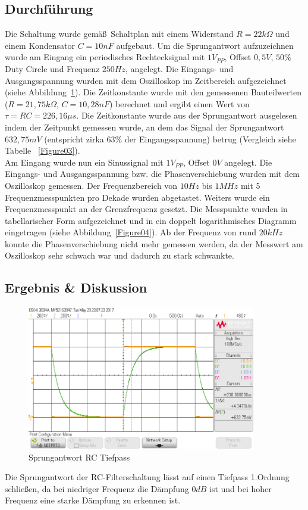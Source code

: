 \documentclass[12pt,a4paper,titlepage]{article}
\begin{document}
\subsection{Durchf\"uhrung}
Die Schaltung wurde gem\"a\ss\, Schaltplan mit einem Widerstand $R=22k\Omega$ und einem Kondensator $C=10nF$ aufgebaut. Um die Sprungantwort aufzuzeichnen wurde am Eingang ein periodisches Rechtecksignal mit $1 V_{PP}$, Offset $0,5 V$, $50 \%$ Duty Circle und Frequenz $250 Hz$, angelegt. Die Eingangs- und Ausgangsspannung wurden mit dem Oszilloskop im Zeitbereich aufgezeichnet (siehe Abbildung~\ref{Figure02}). Die Zeitkonstante wurde mit den gemessenen Bauteilwerten ($R=21,75 k\Omega$, $C=10,28nF$) berechnet und ergibt einen Wert von $\tau = RC = 226,16 \mu s$. Die Zeitkonstante wurde aus der Sprungantwort ausgelesen indem der Zeitpunkt gemessen wurde, an dem das Signal der Sprungantwort $632,75 mV$ (entspricht zirka $63 \%$ der Eingangsspannung) betrug (Vergleich siehe Tabelle ~\ref{Figure03}). \\
Am Eingang wurde nun ein Sinussignal mit $1 V_{PP}$, Offset $0 V$ angelegt. Die Eingangs- und Ausgangsspannung bzw. die Phasenverschiebung wurden mit dem Oszilloskop gemessen. Der Frequenzbereich von $10Hz$ bis $1MHz$ mit 5 Frequenzmesspunkten pro Dekade wurden abgetastet. Weiters wurde ein Frequenzmesspunkt an der Grenzfrequenz gesetzt. Die Messpunkte wurden in tabellarischer Form aufgezeichnet und in ein doppelt logarithmisches Diagramm eingetragen (siehe Abbildung~\ref{Figure04}). Ab der Frequenz von rund $20kHz$ konnte die Phasenverschiebung nicht mehr gemessen werden, da der Messwert am Oszilloskop sehr schwach war und dadurch zu stark schwankte.

\subsection{Ergebnis \& Diskussion}
\begin{figure}[H]
  \centering
  \includegraphics[width=100mm]{sprungantwort_rc_tiefpass.png}
  \caption{Sprungantwort RC Tiefpass}
  \label{Figure02}
\end{figure}
\noindent Die Sprungantwort der RC-Filterschaltung l\"asst auf einen Tiefpass 1.Ordnung schlie\ss en, da bei niedriger Frequenz die D\"ampfung $0dB$ ist und bei hoher Frequenz eine starke D\"ampfung zu erkennen ist.
\end{document}
